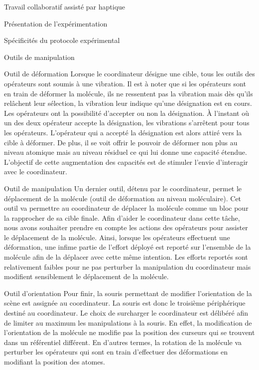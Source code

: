 \documentclass[myfrancais]{mythesis}
\begin{document}
\begin{mychapter}{Travail collaboratif assisté par haptique}
\begin{mysection}{Présentation de l'expérimentation}
\begin{mysubsection}{Spécificités du protocole expérimental}
\begin{mysubsubsection}{Outils de manipulation}
\begin{myparagraph}{Outil de déformation}
						Lorsque le coordinateur désigne une cible, tous les outils des opérateurs sont soumis à une vibration.
						Il est à noter que si les opérateurs sont en train de déformer la molécule, ils ne ressentent pas la vibration mais dès qu'ils relâchent leur sélection, la vibration leur indique qu'une désignation est en cours.
						Les opérateurs ont la possibilité d'accepter ou non la désignation.
						À l'instant où un des deux opérateur accepte la désignation, les vibrations s'arrêtent pour tous les opérateurs.
						L'opérateur qui a accepté la désignation est alors attiré vers la cible à déformer.
						De plus, il se voit offrir le pouvoir de déformer non plus au niveau atomique mais au niveau résiduel ce qui lui donne une capacité étendue.
						L'objectif de cette augmentation des capacités est de stimuler l'envie d'interagir avec le coordinateur.
					\end{myparagraph}
					\begin{myparagraph}{Outil de manipulation}
						Un dernier outil, détenu par le coordinateur, permet le déplacement de la molécule (outil de déformation au niveau moléculaire).
						Cet outil va permettre au coordinateur de déplacer la molécule comme un bloc pour la rapprocher de sa cible finale.
						Afin d'aider le coordinateur dans cette tâche, nous avons souhaiter prendre en compte les actions des opérateurs pour assister le déplacement de la molécule.
						Ainsi, lorsque les opérateurs effectuent une déformation, une infime partie de l'effort déployé est reporté sur l'ensemble de la molécule afin de la déplacer avec cette même intention.
						Les efforts reportés sont relativement faibles pour ne pas perturber la manipulation du coordinateur mais modifient sensiblement le déplacement de la molécule.
					\end{myparagraph}
					\begin{myparagraph}{Outil d'orientation}
						Pour finir, la souris permettant de modifier l'orientation de la scène est assignée au coordinateur.
						La souris est donc le troisième périphérique destiné au coordinateur.
						Le choix de surcharger le coordinateur est délibéré afin de limiter au maximum les manipulations à la souris.
						En effet, la modification de l'orientation de la molécule ne modifie pas la position des curseurs qui se trouvent dans un référentiel différent.
						En d'autres termes, la rotation de la molécule va perturber les opérateurs qui sont en train d'effectuer des déformations en modifiant la position des atomes.

\end{myparagraph}
\end{mysubsubsection}
\end{mysubsection}
\end{mysection}
\end{mychapter}
\end{document}
